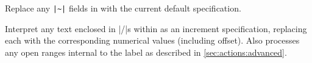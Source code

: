 \documentclass[a4paper]{ltxdoc}
\begin{document}
\begin{command}{\parsedefincspec {}}
  Replace any \texttt{|\~{}|} fields in  with the current
  default specification.
\end{command}
  
\begin{command}{\parseincrspec {}}
  Interpret any text enclosed in |/|s within  as an increment
  specification, replacing each with the corresponding numerical values
  (including offset).  Also processes any open ranges internal to the label as
  described in \cref{sec:actions:advanced}.
\end{command}

\begin{command}{\parseresetspec {}}
\end{command}

\begin{command}{\parselabelspec {}}
\end{command}




%




%  
% 
\end{document}
